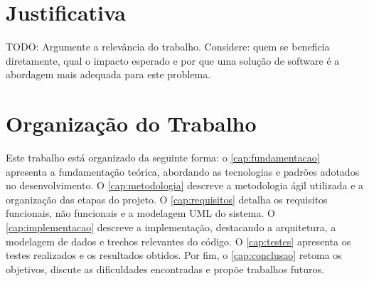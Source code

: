 \section{Justificativa}
\label{sec:justificativa}

TODO: Argumente a relevância do trabalho. Considere: quem se beneficia
diretamente, qual o impacto esperado e por que uma solução de software é a
abordagem mais adequada para este problema.


\section{Organização do Trabalho}
\label{sec:organizacao}

Este trabalho está organizado da seguinte forma: o
\cref{cap:fundamentacao} apresenta a fundamentação teórica, abordando as
tecnologias e padrões adotados no desenvolvimento. O
\cref{cap:metodologia} descreve a metodologia ágil utilizada e a
organização das etapas do projeto. O \cref{cap:requisitos} detalha os
requisitos funcionais, não funcionais e a modelagem UML do sistema. O
\cref{cap:implementacao} descreve a implementação, destacando a
arquitetura, a modelagem de dados e trechos relevantes do código. O
\cref{cap:testes} apresenta os testes realizados e os resultados obtidos.
Por fim, o \cref{cap:conclusao} retoma os objetivos, discute as
dificuldades encontradas e propõe trabalhos futuros.
